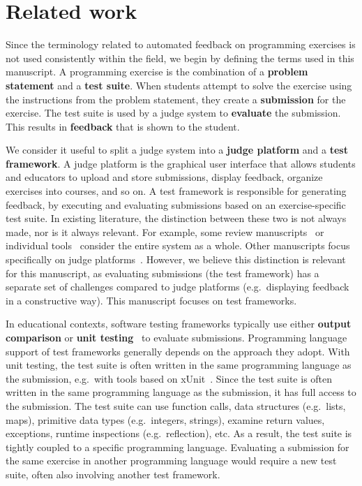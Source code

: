 \documentclass[../main]{subfiles}
\begin{document}
\section{Related work}\label{sec:tested1-related-work}

Since the terminology related to automated feedback on programming exercises is not used consistently within the field,
we begin by defining the terms used in this manuscript.
A programming exercise is the combination of a \textbf{problem statement} and a \textbf{test suite}.
When students attempt to solve the exercise using the instructions from the problem statement, they create a \textbf{submission} for the exercise.
The test suite is used by a judge system to \textbf{evaluate} the submission.
This results in \textbf{feedback} that is shown to the student.

We consider it useful to split a judge system into a \textbf{judge platform} and a \textbf{test framework}.
A judge platform is the graphical user interface that allows students and educators to upload and store submissions, display feedback, organize exercises into courses, and so on.
A test framework is responsible for generating feedback, by executing and evaluating submissions based on an exercise-specific test suite.
In existing literature, the distinction between these two is not always made, nor is it always relevant.
For example, some review manuscripts~\autocite{keuningSystematicLiteratureReview2018,wasikSurveyOnlineJudge2018} or individual tools~\autocite{bezURIOnlineJudge2014,petitJutgeOrgCharacteristics2018} consider the entire system as a whole.
Other manuscripts focus specifically on judge platforms~\autocite{gusukumaPedalInfrastructureAutomated2020,strieweArchitectureModularGrading2016}.
However, we believe this distinction is relevant for this manuscript, as evaluating submissions (the test framework) has a separate set of challenges compared to judge platforms (e.g.\ displaying feedback in a constructive way).
This manuscript focuses on test frameworks.

In educational contexts, software testing frameworks typically use either \textbf{output comparison} or \textbf{unit testing}~\autocite{paivaAutomatedAssessmentComputer2022a} to evaluate submissions.
Programming language support of test frameworks generally depends on the approach they adopt.
With unit testing, the test suite is often written in the same programming language as the submission, e.g.\ with tools based on xUnit~\autocite{meszarosXUnitTestPatterns2007}.
Since the test suite is often written in the same programming language as the submission, it has full access to the submission.
The test suite can use function calls, data structures (e.g.\ lists, maps), primitive data types (e.g.\ integers, strings), examine return values, exceptions, runtime inspections (e.g.\ reflection), etc.
As a result, the test suite is tightly coupled to a specific programming language.
Evaluating a submission for the same exercise in another programming language would require a new test suite, often also involving another test framework.
\end{document}
